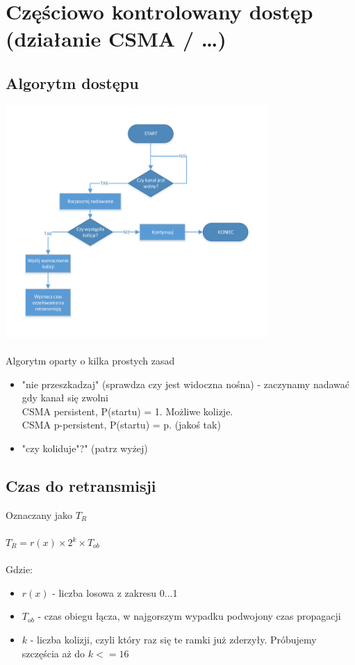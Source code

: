 \documentclass[a4paper,twoside]{article}
\begin{document}
\section{Częściowo kontrolowany dostęp (działanie CSMA / …)}
\subsection{Algorytm dostępu}
\includegraphics[width=10cm]{./images/image20.pdf}\\\\
Algorytm oparty o kilka prostych zasad
\begin{itemize}
	\item "nie przeszkadzaj" (sprawdza czy jest widoczna nośna) - zaczynamy nadawać gdy kanał się zwolni\\
	CSMA persistent, P(startu) = 1. Możliwe kolizje.\\
	CSMA p-persistent, P(startu) = p. (jakoś tak)
	\item "czy koliduje"?" (patrz wyżej)
\end{itemize}
\subsection{Czas do retransmisji}
Oznaczany jako $ T_{R} $\\\\
$ T_{R} = r(x)\times 2^{k}\times T_{ob}$\\\\Gdzie:\\
\begin{itemize}
	\item $ r(x) $ - liczba losowa z zakresu 0...1
	\item $ T_{ob} $ - czas obiegu łącza, w najgorszym wypadku podwojony czas propagacji
	\item $ k $ - liczba kolizji, czyli który raz się te ramki już zderzyły. Próbujemy szczęścia aż do $ k <=16 $
\end{itemize}
\end{document}
